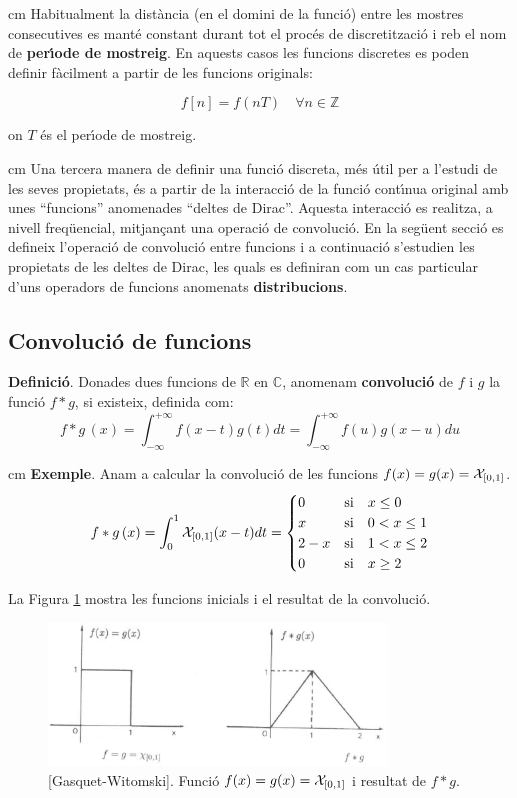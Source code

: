 \documentclass{article}
\def\Z{\mathbb Z}
\def\R{\mathbb R}
\def\C{\mathbb C}
\begin{document}
 cm
Habitualment la dist\`ancia (en el domini de la funci\'o) entre les mostres
consecutives es mant\'e constant durant tot el proc\'es de discretitzaci\'o
i reb el nom de {\bf per\'\i ode de mostreig}. En aquests casos les funcions 
discretes es poden definir f\`acilment a partir de les funcions originals:

\[
f[n]=f(nT) \quad \forall n \in \Z
\]

\noindent
on $T$ \'es el per\'\i ode de mostreig.
 
 cm
Una tercera manera de definir una funci\'o discreta, m\'es \'util 
per a l'estudi de les seves propietats, \'es a partir de la interacci\'o
de la funci\'o cont\'\i nua original amb unes ``funcions'' anomenades
``deltes de Dirac''. Aquesta interacci\'o es realitza, a nivell freq\"uencial,
 mitjan\c{c}ant una operaci\'o de convoluci\'o.
\newline
En la seg\"uent secci\'o es defineix l'operaci\'o de convoluci\'o entre
funcions i a continuaci\'o s'estudien les propietats de les deltes de Dirac,
les quals es definiran com un cas particular d'uns operadors de funcions 
anomenats {\bf distribucions}.


\subsection{Convoluci\'o de funcions}
\noindent
\textbf{Definici\'o}. Donades dues funcions de $\R$ en $\C$, anomenam
{\bf convoluci\'o} de $f$ i $g$ la funci\'o $f * g$, si existeix, 
definida com:
\[
f * g \, (x)=\int_{-\infty}^{+\infty} f(x-t) g(t) dt =
\int_{-\infty}^{+\infty} f(u) g(x-u) du
\]

 cm
\noindent
\textbf{Exemple}. Anam a calcular la convoluci\'o de les funcions
$f(x)=g(x)={\cal X}_{[0, 1]}$.
\[
f * g \, (x) = \int_0^1 {\cal X}_{[0, 1]} (x-t) dt = 
\begin{cases} 
0    & \mathrm{si} \quad x \leq 0\\
x    & \mathrm{si} \quad 0 < x \leq 1\\
2-x  & \mathrm{si} \quad 1 < x \leq 2\\
0    & \mathrm{si} \quad x \geq 2
\end{cases}
\]

\noindent
La Figura \ref{figpulse.fig} mostra les funcions inicials 
i el resultat de la convoluci\'o.  

\begin{figure}[htbp]
\begin{center}
\includegraphics[width=9cm]{imatges/exconvolucio.eps}
\caption{[Gasquet-Witomski]. Funci\'o $f(x)=g(x)={\cal X}_{[0, 1]}$ i 
resultat de $f * g$.}
\end{center}
\label{figpulse.fig}
\end{figure}
\end{document}
